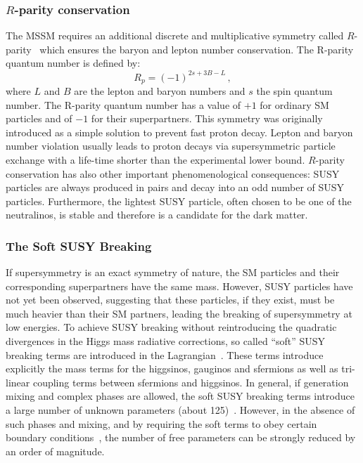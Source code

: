\subsubsection{$R$-parity conservation}
The MSSM requires an additional discrete and multiplicative symmetry called $R$-parity~\cite{Susy3} which ensures the baryon and lepton number 
conservation. The R-parity quantum number  is defined by:
\begin{equation}
R_p = (-1)^{2s+3B-L}\,,
\end{equation}
where $L$ and $B$ are the lepton and baryon numbers and $s$  the spin quantum number. The R-parity quantum number has a value of $+1$ for ordinary
SM particles and of $-1$ for their superpartners. This symmetry was originally introduced as a simple solution to 
prevent fast proton decay. Lepton and baryon number violation usually leads to
proton decays via supersymmetric particle exchange with a life-time shorter than the 
experimental lower bound. $R$-parity conservation has also other important 
phenomenological consequences: SUSY particles are always produced in pairs and decay  into an odd number of SUSY particles.
Furthermore, the lightest SUSY particle, often chosen to be one of the neutralinos, is stable and therefore is a 
candidate for the dark matter.


\subsubsection{The Soft SUSY Breaking}
If supersymmetry is an exact symmetry of nature, the SM particles and their corresponding superpartners  have the same mass. 
However, SUSY particles have not yet been observed, suggesting that  these particles,
if they exist,  must be much heavier than their SM partners, leading the breaking of supersymmetry at low energies. 
To achieve SUSY breaking without reintroducing the quadratic divergences in the Higgs mass
radiative corrections,  so called ``soft'' SUSY breaking terms are 
introduced in the Lagrangian~\cite{softerm1,softerm2}. 
These terms introduce explicitly the mass terms for the higgsinos, gauginos and
sfermions as well as  tri-linear coupling terms between sfermions and higgsinos. 
In general, if generation mixing and complex phases are allowed, the soft SUSY breaking 
terms  introduce a  large number of unknown parameters (about 125)~\cite{softerm3}.
However, in the absence of such phases and  mixing, and  by requiring  the soft terms to 
obey  certain  boundary conditions~\cite{softerm1,softerm2}, the number of free parameters can be strongly reduced by an order of 
magnitude.


